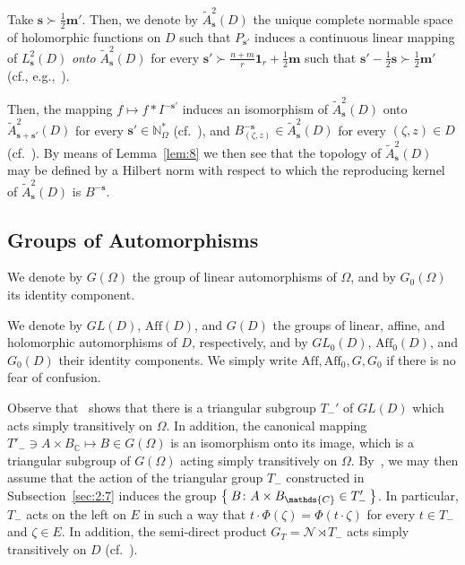 \documentclass[10.5pt,reqno]{amsart}
\newcommand{\Aff}{\mathrm{Aff}}
\newcommand{\vect}[1]{\mathbf{{#1}}}
\newcommand{\N}{\mathds{N}}
\newcommand{\C}{\mathds{C}}
\newcommand{\Nc}{\mathcal{N}}
\begin{document}
\begin{deff}
	Take $\vect s\succ\frac{1}{2}\vect m'$. Then, we denote by $\widetilde A^2_{\vect s}(D)$ the unique complete normable space of holomorphic functions on $D$ such that $P_{\vect s'}$ induces a continuous linear mapping of $L^2_{\vect s}(D)$ \emph{onto} $\widetilde A^2_{\vect s}(D)$ for every $\vect s'\succ\frac{n+m}{r}\vect 1_r+ \frac{1}{2}\vect m$ such that $ \vect s'-\frac 1 2 \vect s\succ \frac 1 2\vect m'$ (cf., e.g.,~\cite[Proposition 2.4 and Theorem 4.5]{Paralipomena}).  
\end{deff}



Then, the mapping $f\mapsto f* I^{-\vect s'}$ induces an isomorphism of $\widetilde A^{2}_{\vect s}(D)$ onto $\widetilde A^{2}_{\vect s+\vect s'}(D)$ for every $\vect s'\in \N_\Omega^*$ (cf.~\cite[Proposition 5.13]{CalziPeloso}), and $B^{-\vect s}_{(\zeta,z)}\in \widetilde A^2_{\vect s}(D)$ for every $(\zeta,z)\in D$ (cf.~\cite[Lemma 5.15]{CalziPeloso}). By means of Lemma~\ref{lem:8} we then see that the topology of $\widetilde A^2_{\vect s}(D)$ may be defined by a Hilbert norm with respect to which the reproducing kernel of $\widetilde A^2_{\vect s}(D)$ is $B^{-\vect s}$.



\subsection{Groups of Automorphisms}



\begin{deff}
	We denote by $G(\Omega)$ the group of linear automorphisms of $\Omega$, and by $G_0(\Omega)$ its identity component. 
	
	We denote by $GL(D)$, $\Aff(D)$, and $G(D)$ the groups of linear, affine, and holomorphic automorphisms of $D$, respectively, and by $GL_0(D)$, $\Aff_0(D)$, and $G_0(D)$ their identity components. We simply write $\Aff, \Aff_0, G, G_0$ if there is no fear of confusion.
\end{deff}

Observe that~\cite[p.~14--15]{Kaneyuki} shows that there is a triangular subgroup $T_-'$ of $GL(D)$ which acts simply transitively on $\Omega$. In addition, the canonical mapping $T'_-\ni A\times B_\C\mapsto B\in G(\Omega)$ is an isomorphism onto its image, which is a triangular subgroup of $G(\Omega)$ acting simply transitively on $\Omega$. By~\cite{Vinberg2}, we may then assume that the action of the triangular group $T_-$ constructed in Subsection~\ref{sec:2:7}  induces the group $\Set{B\colon A\times B_\C\in T_-'}$. 
In particular, $T_-$ acts on the left on $E$ in such a way that $t\cdot \Phi(\zeta)=\Phi(t\cdot \zeta)$ for every $t\in T_-$ and $\zeta\in E$. In addition, the semi-direct product $G_T=\Nc \rtimes T_-$ acts simply transitively on $D$ (cf.~\cite[Proposition 2.1]{Murakami}).
\end{document}
